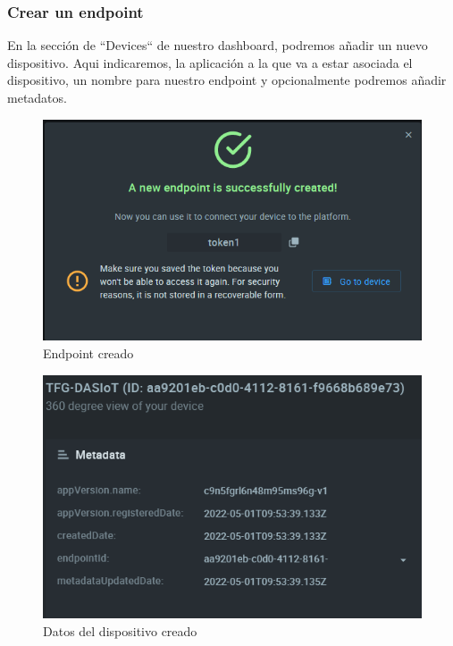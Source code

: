 \subsubsection{Crear un endpoint}

En la sección de ``Devices`` de nuestro dashboard, podremos añadir un nuevo dispositivo. Aqui indicaremos, la aplicación a la que va a estar asociada el dispositivo, un nombre para nuestro endpoint y opcionalmente podremos añadir metadatos.

\begin{figure}[p]
    \centering
    \includegraphics[width=\linewidth]{imagenes/device-added.png}
    \caption{Endpoint creado}
    \label{fig:figure8}
\end{figure}

\begin{figure}[p]
    \centering
    \includegraphics[width=\linewidth]{imagenes/device-created-view.png}
    \caption{Datos del dispositivo creado}
    \label{fig:figure9}
\end{figure}

